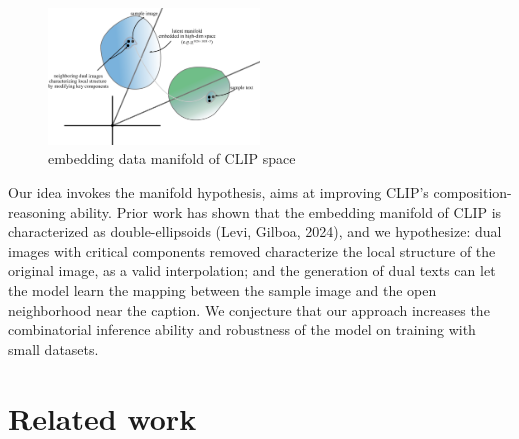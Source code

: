 \documentclass[11pt,letterpaper]{article}
\begin{document}
\begin{figure}  %
  \includegraphics[width=0.5\textwidth]{final_report/assets/manifold.png}  %
  \caption{embedding data manifold of CLIP space}
\end{figure}
Our idea invokes the manifold hypothesis, aims at improving CLIP's composition-reasoning ability. Prior work has shown that the embedding manifold of CLIP is characterized as double-ellipsoids\cite{levi2024doubleellipsoidgeometryclip} (Levi, Gilboa, 2024), and we hypothesize: dual images with critical components removed characterize the local structure of the original image, as a valid interpolation; and the generation of dual texts can let the model learn the mapping between the sample image and the open neighborhood near the caption. We conjecture that our approach increases the combinatorial inference ability and robustness of the model on training with small datasets.

\section{Related work}
\end{document}
